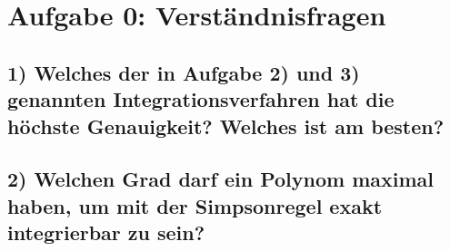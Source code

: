 \setcounter{secnumdepth}{0}
\section{Aufgabe 0: Verständnisfragen}
\label{sec:auf0}

\subsection{1) \textbf{Welches der in Aufgabe 2) und 3) genannten Integrationsverfahren hat die höchste Genauigkeit? Welches ist am besten?}}

\subsection{2) \textbf{Welchen Grad darf ein Polynom maximal haben, um mit der Simpsonregel exakt integrierbar zu sein?}}
